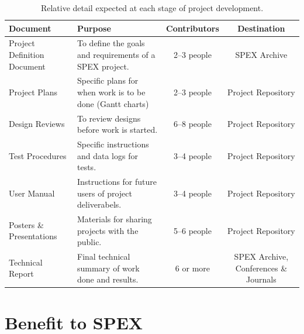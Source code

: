 \documentclass[conference]{IEEEtran} %
\begin{document}
\begin{table}
    \caption{Relative detail expected at each stage of project development.}
    \centering
    \begin{tabular}{@{}llcc@{}}
        \toprule %
        Document & Purpose & Contributors & Destination \\
        \midrule %
        Project Definition Document & To define the goals and requirements of a SPEX project. & 2--3 people & SPEX Archive \\
        Project Plans & Specific plans for when work is to be done (Gantt charts) & 2--3 people & Project Repository \\
        Design Reviews & To review designs before work is started. & 6--8 people & Project Repository \\
        Test Procedures & Specific instructions and data logs for tests. & 3--4 people & Project Repository \\
        User Manual & Instructions for future users of project deliverabels. & 3--4 people & Project Repository \\
        Posters \& Presentations & Materials for sharing projects with the public. & 5--6 people & Project Repository \\
        Technical Report & Final technical summary of work done and results. & 6 or more & SPEX Archive, Conferences \& Journals \\
        \bottomrule
    \end{tabular}
\label{tab:long-example}
\end{table}

\section{Benefit to SPEX}
\label{sec:benefit}
\end{document}
